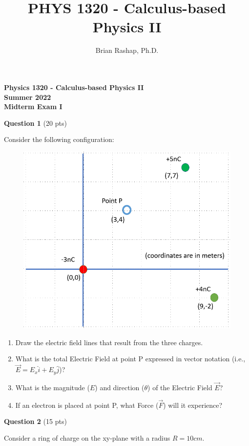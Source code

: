 \documentclass[14pt]{report}
\author{Brian Rashap, Ph.D.}
\title{PHYS 1320 - Calculus-based Physics II}
\begin{document}
\begin{center}
\textbf{Physics 1320 - Calculus-based Physics II \\ Summer 2022 \\ Midterm Exam I}
\end{center}

\textbf{Question 1} (20 pts)

Consider the following configuration:

\begin{figure}[H]
\begin{center}
\includegraphics[scale=0.30]{exam1_1.png}
\end{center}
\end{figure}
\begin{enumerate}[label=\Alph*]
\item Draw the electric field lines that result from the three charges.
\item What is the total Electric Field at point P expressed in vector notation (i.e., $\vec{E} = E_x \hat{i} + E_y \hat{j}$)?
\item What is the magnitude ($E$) and direction ($\theta$) of the Electric Field $\vec{E}$?
\item If an electron is placed at point P, what Force ($\vec{F}$) will it experience?
\end{enumerate}

\textbf{Question 2} (15 pts)

Consider a ring of charge on the xy-plane with a radius $R = 10cm$. 
\end{document}
